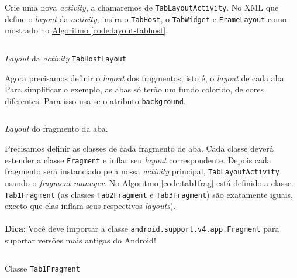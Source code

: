\documentclass[a4paper,12pt,brazil,oneside]{book}
\begin{document}
\begin{singlespace}
	Crie uma nova \emph{activity}, a chamaremos de \texttt{TabLayoutActivity}. No XML que define o \emph{layout} da \emph{activity}, insira o \texttt{TabHost}, o \texttt{TabWidget} e \texttt{FrameLayout} como mostrado no \hyperref[code:layout-tabhost]{Algoritmo \ref*{code:layout-tabhost}}.
	
	\begin{listing}[H]
	\inputminted[linenos=true,fontsize=\small,frame=lines, framesep=2mm, tabsize=2,numbersep=5pt]{xml}{src/design/activity-tab-host.xml}
	\caption{\emph{Layout} da \emph{activity} \texttt{TabHostLayout}}
	\label{code:layout-tabhost}
	\end{listing}
	
	Agora precisamos definir o \emph{layout} dos fragmentos, isto é, o \emph{layout} de cada aba. Para simplificar o exemplo, as abas só terão um fundo colorido, de cores diferentes. Para isso usa-se o atributo \texttt{background}.
	
	\begin{listing}[H]
	\inputminted[linenos=true,fontsize=\small,frame=lines, framesep=2mm, tabsize=2,numbersep=5pt]{xml}{src/design/tab-fragment.xml}
	\caption{\emph{Layout} do fragmento da aba.}
	\end{listing}
	
	Precisamos definir as classes de cada fragmento de aba. Cada classe deverá estender a classe \texttt{Fragment} e inflar seu \emph{layout} correspondente. Depois cada fragmento será instanciado pela nossa \emph{activity} principal, \texttt{TabLayoutActivity} usando o \emph{fragment manager}. No \hyperref[code:tab1frag]{Algoritmo \ref*{code:tab1frag}} está definido a classe \texttt{Tab1Fragment} (as classes \texttt{Tab2Fragment} e \texttt{Tab3Fragment}) são exatamente iguais, exceto que elas inflam seus respectivos \emph{layouts}).
		
	\begin{framed}
	\paragraph{}\textbf{Dica}: Você deve importar a classe \texttt{android.support.v4.app.Fragment} para suportar versões mais antigas do Android!
	\textit{}
	\end{framed}

	\begin{listing}[H]
	\inputminted[linenos=true,fontsize=\small,frame=lines, framesep=2mm, tabsize=2,numbersep=5pt]{java}{src/design/tab1-frag.java}
	\caption{Classe \texttt{Tab1Fragment}}
	\label{code:tab1frag}
	\end{listing}
	

\end{singlespace}
\end{document}
